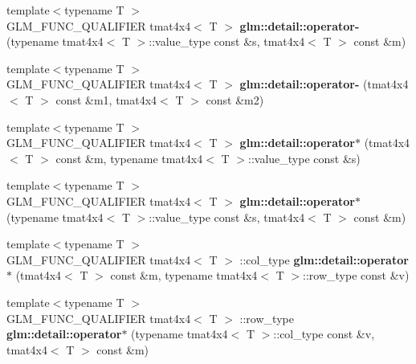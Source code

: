 \begin{DoxyCompactItemize}
\item 
\hypertarget{namespaceglm_1_1detail_ab8c37ba8caa7eacee94c69505f3d3670}{{\footnotesize template$<$typename T $>$ }\\\-G\-L\-M\-\_\-\-F\-U\-N\-C\-\_\-\-Q\-U\-A\-L\-I\-F\-I\-E\-R tmat4x4$<$ \-T $>$ {\bfseries glm\-::detail\-::operator-\/} (typename tmat4x4$<$ \-T $>$\-::value\-\_\-type const \&s, tmat4x4$<$ \-T $>$ const \&m)}\label{namespaceglm_1_1detail_ab8c37ba8caa7eacee94c69505f3d3670}

\item 
\hypertarget{namespaceglm_1_1detail_a39935cfee0b8b63f8c1716058e8faedb}{{\footnotesize template$<$typename T $>$ }\\\-G\-L\-M\-\_\-\-F\-U\-N\-C\-\_\-\-Q\-U\-A\-L\-I\-F\-I\-E\-R tmat4x4$<$ \-T $>$ {\bfseries glm\-::detail\-::operator-\/} (tmat4x4$<$ \-T $>$ const \&m1, tmat4x4$<$ \-T $>$ const \&m2)}\label{namespaceglm_1_1detail_a39935cfee0b8b63f8c1716058e8faedb}

\item 
\hypertarget{namespaceglm_1_1detail_ace2530d9d1d3fc7ac4e2a76d65467fed}{{\footnotesize template$<$typename T $>$ }\\\-G\-L\-M\-\_\-\-F\-U\-N\-C\-\_\-\-Q\-U\-A\-L\-I\-F\-I\-E\-R tmat4x4$<$ \-T $>$ {\bfseries glm\-::detail\-::operator$\ast$} (tmat4x4$<$ \-T $>$ const \&m, typename tmat4x4$<$ \-T $>$\-::value\-\_\-type const \&s)}\label{namespaceglm_1_1detail_ace2530d9d1d3fc7ac4e2a76d65467fed}

\item 
\hypertarget{namespaceglm_1_1detail_ab15a8b6c9206f93b74611f82cc77a95a}{{\footnotesize template$<$typename T $>$ }\\\-G\-L\-M\-\_\-\-F\-U\-N\-C\-\_\-\-Q\-U\-A\-L\-I\-F\-I\-E\-R tmat4x4$<$ \-T $>$ {\bfseries glm\-::detail\-::operator$\ast$} (typename tmat4x4$<$ \-T $>$\-::value\-\_\-type const \&s, tmat4x4$<$ \-T $>$ const \&m)}\label{namespaceglm_1_1detail_ab15a8b6c9206f93b74611f82cc77a95a}

\item 
\hypertarget{namespaceglm_1_1detail_af97a2dc9dc200c8b81fec29178dbcfbc}{{\footnotesize template$<$typename T $>$ }\\\-G\-L\-M\-\_\-\-F\-U\-N\-C\-\_\-\-Q\-U\-A\-L\-I\-F\-I\-E\-R tmat4x4$<$ \-T $>$\*
\-::col\-\_\-type {\bfseries glm\-::detail\-::operator$\ast$} (tmat4x4$<$ \-T $>$ const \&m, typename tmat4x4$<$ \-T $>$\-::row\-\_\-type const \&v)}\label{namespaceglm_1_1detail_af97a2dc9dc200c8b81fec29178dbcfbc}

\item 
\hypertarget{namespaceglm_1_1detail_a4efac78463573bd8560b6a1d939c5664}{{\footnotesize template$<$typename T $>$ }\\\-G\-L\-M\-\_\-\-F\-U\-N\-C\-\_\-\-Q\-U\-A\-L\-I\-F\-I\-E\-R tmat4x4$<$ \-T $>$\*
\-::row\-\_\-type {\bfseries glm\-::detail\-::operator$\ast$} (typename tmat4x4$<$ \-T $>$\-::col\-\_\-type const \&v, tmat4x4$<$ \-T $>$ const \&m)}\label{namespaceglm_1_1detail_a4efac78463573bd8560b6a1d939c5664}


\end{DoxyCompactItemize}
